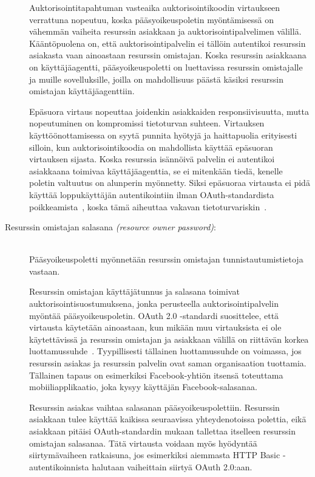 \documentclass[finnish,gradu]{tktltiki}
\begin{document}
\begin{description}
  Auktorisointitapahtuman vasteaika auktorisointikoodin virtaukseen verrattuna nopeutuu, koska pääsyoikeuspoletin myöntämisessä on vähemmän vaiheita resurssin asiakkaan ja auktorisointipalvelimen välillä.  Kääntöpuolena on, että auktorisointipalvelin ei tällöin autentikoi resurssin asiakasta vaan ainoastaan resurssin omistajan. Koska resurssin asiakkaana on käyttäjäagentti, pääsyoikeuspoletti on luettavissa resurssin omistajalle ja muille sovelluksille, joilla on mahdollisuus päästä käsiksi resurssin omistajan käyttäjäagenttiin.

  Epäsuora virtaus nopeuttaa joidenkin asiakkaiden responsiivisuutta, mutta nopeutuminen on kompromissi tietoturvan suhteen. Virtauksen käyttöönottamisessa on syytä punnita hyötyjä ja haittapuolia erityisesti silloin, kun auktorisointikoodia on mahdollista käyttää epäsuoran virtauksen sijasta. Koska resurssia isännöivä palvelin ei autentikoi asiakkaana toimivaa käyttäjäagenttia, se ei mitenkään tiedä, kenelle poletin valtuutus on alunperin myönnetty. Siksi epäsuoraa virtausta ei pidä käyttää loppukäyttäjän autentikointiin ilman OAuth-standardista poikkeamista~\cite{facebook_oauth2_signed_request}, koska tämä aiheuttaa vakavan tietoturvariskin~\cite{bradley_oauth_authentication_problem_2012, bradley_oauth_implicit_flow_vulnerability_2012, sakimura_oauth_authentication_problem_2012}.


   \item[Resurssin omistajan salasana \emph{(resource owner password)}:] \hfill \\
   Pääsyoikeuspoletti myönnetään resurssin omistajan tunnistautumistietoja vastaan.

   Resurssin omistajan käyttäjätunnus ja salasana toimivat auktorisointisuostumuksena, jonka perusteella auktorisointipalvelin myöntää pääsyoikeuspoletin. OAuth 2.0 -standardi suosittelee, että virtausta käytetään ainoastaan, kun mikään muu virtauksista ei ole käytettävissä ja resurssin omistajan ja asiakkaan välillä on riittävän korkea luottamussuhde~\cite{ietf_oauth2}. Tyypillisesti tällainen luottamussuhde on voimassa, jos resurssin asiakas ja resurssin palvelin ovat saman organisaation tuottamia. Tällainen tapaus on esimerkiksi Facebook-yhtiön itsensä toteuttama mobiiliapplikaatio, joka kysyy käyttäjän Facebook-salasanaa.

   Resurssin asiakas vaihtaa salasanan pääsyoikeuspolettiin. Resurssin asiakkaan tulee käyttää kaikissa seuraavissa yhteydenotoissa polettia, eikä asiakkaan pitäisi OAuth-standardin mukaan tallettaa itselleen resurssin omistajan salasanaa. Tätä virtausta voidaan myös hyödyntää siirtymävaiheen ratkaisuna, jos esimerkiksi aiemmasta HTTP Basic -autentikoinnista halutaan vaiheittain siirtyä OAuth 2.0:aan.


\end{description}
\end{document}
